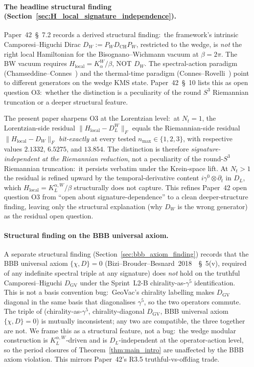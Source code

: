 \documentclass[11pt,a4paper]{article}
\theoremstyle{plain}
\theoremstyle{definition}
\newcommand{\nmax}{n_{\max}}
\newcommand{\Nt}{N_t}
\newcommand{\sthree}{S^{3}}
\newcommand{\Frob}[1]{\lVert #1 \rVert_{F}}
\newcommand{\DCH}{D_{\mathrm{CH}}}
\newcommand{\DGV}{D_{\mathrm{GV}}}
\newcommand{\DL}{D_{L}}
\newcommand{\KL}{K_{L}}
\begin{document}
\paragraph{The headline structural finding (Section~\ref{sec:H_local_signature_independence}).}
Paper~42~\S~7.2 records a derived structural finding:\ the framework's
intrinsic Camporesi--Higuchi Dirac $D_W := P_W \DCH P_W$, restricted to
the wedge, is \emph{not} the right local Hamiltonian for the
Bisognano--Wichmann vacuum at $\beta = 2\pi$. The BW vacuum requires
$H_{\mathrm{local}} = K_\alpha^W / \beta$, NOT $D_W$. The spectral-action
paradigm (Chamseddine--Connes~\cite{chamseddine_connes2010}) and the
thermal-time paradigm (Connes--Rovelli~\cite{connes_rovelli1994}) point
to different generators on the wedge KMS state. Paper~42~\S~10 lists
this as open question O3:\ whether the distinction is a peculiarity of
the round $\sthree$ Riemannian truncation or a deeper structural
feature.

The present paper sharpens O3 at the Lorentzian level:\ at $\Nt = 1$,
the Lorentzian-side residual $\Frob{H_{\mathrm{local}} - \DL^W}$
equals the Riemannian-side residual
$\Frob{H_{\mathrm{local}} - D_W}$ \emph{bit-exactly} at every tested
$\nmax \in \{1, 2, 3\}$, with respective values $2.1332$, $6.5275$, and
$13.854$. The distinction is therefore \emph{signature-independent at
the Riemannian reduction}, not a peculiarity of the round-$\sthree$
Riemannian truncation:\ it persists verbatim under the Krein-space
lift. At $\Nt > 1$ the residual is refined upward by the
temporal-derivative content $i \gamma^0 \otimes \partial_t$ in $\DL$,
which $H_{\mathrm{local}} = \KL^{\alpha, W}/\beta$ structurally does
not capture. This refines Paper~42 open question O3 from ``open about
signature-dependence'' to a clean deeper-structure finding, leaving
only the structural explanation (why $D_W$ is the wrong generator) as
the residual open question.

\paragraph{Structural finding on the BBB universal axiom.}
A separate structural finding (Section~\ref{sec:bbb_axiom_finding})
records that the BBB universal axiom $\{\chi, D\} = 0$
(Bizi--Brouder--Besnard~2018~\cite{bizi_brouder_besnard2018}~\S~5(v),
required of any indefinite spectral triple at any signature) does
\emph{not} hold on the truthful Camporesi--Higuchi $\DGV$ under the
Sprint~L2-B chirality-as-$\gamma^5$ identification. This is not a basis
convention bug:\ GeoVac's chirality labelling makes $\DGV$ diagonal in
the same basis that diagonalises $\gamma^5$, so the two operators
commute. The triple of (chirality-as-$\gamma^5$,
chirality-diagonal $\DGV$, BBB universal axiom $\{\chi, D\} = 0$) is
mutually inconsistent; any two are compatible, the three together are
not. We frame this as a structural feature, not a bug:\ the wedge
modular construction is $\KL^{\alpha, W}$-driven and is
$\DL$-independent at the operator-action level, so the period closures
of Theorem~\ref{thm:main_intro} are unaffected by the BBB axiom
violation. This mirrors Paper~42's R3.5 truthful-vs-offdiag
trade.
\end{document}

